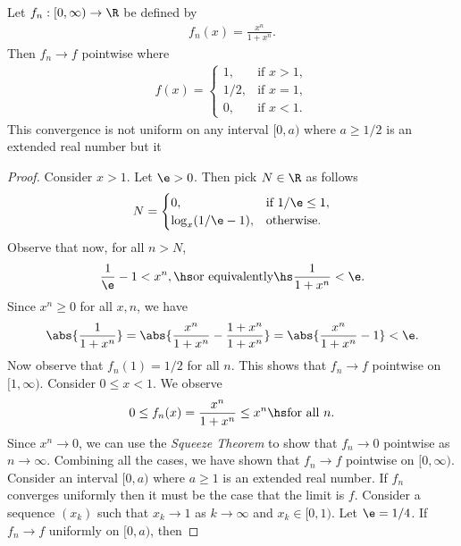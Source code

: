 \documentclass{article}
\begin{document}
\begin{claim*}
	Let $f_n:[0,\infty)\to\R$ be defined by
	\begin{align*}
		f_n(x) = \frac{x^n}{1+x^n}.
	\end{align*}
	Then $f_n\to f$ pointwise where
	\begin{align*}
		f(x) = \begin{cases}
			       1,   & \text{if }x > 1, \\
			       1/2, & \text{if }x = 1, \\
			       0,   & \text{if }x < 1.
		       \end{cases}
	\end{align*}
	This convergence is not uniform on any interval $[0, a)$ where
	$a\geq 1/2$ is an extended real number but it
\end{claim*}
\begin{proof}
	Consider $x>1$. Let $\e>0$. Then pick $N\in\R$ as follows
	\begin{align*}
		N = \begin{cases}
			    0,              & \text{if }1/\e \leq 1, \\
			    \log_x(1/\e-1), & \text{otherwise.}
		    \end{cases}
	\end{align*}
	Observe that now, for all $n>N$,
	\begin{align*}
		\frac{1}{\e} - 1 < x^n,
		\hs\text{or equivalently}\hs
		\frac{1}{1+x^n}< \e.
	\end{align*}
	Since $x^n\geq 0$ for all $x,n$, we have
	\begin{align*}
		\abs{\frac{1}{1+x^n}}=\abs{\frac{x^n}{1+x^n}-\frac{1+x^n}{1+x^n}}
		=\abs{\frac{x^n}{1+x^n}-1}<\e.
	\end{align*}
	Now observe that $f_n(1)=1/2$ for all $n$.
	This shows that $f_n\to f$ pointwise on $[1,\infty)$. Consider $0\leq x<1$.
	We observe
	\begin{align*}
		0 \leq f_n(x)=\frac{x^n}{1 + x^n} \leq x^n\hs\text{for all }n.
	\end{align*}
	Since $x^n\to 0$, we can use the \emph{Squeeze Theorem} to show that
	$f_n\to 0$ pointwise as $n\to\infty$. Combining all the cases, we have shown that
	$f_n\to f$ pointwise on $[0, \infty)$. Consider an interval $[0,a)$ where $a\geq 1$
	is an extended real number. If $f_n$ converges uniformly then it must be the
	case that the limit is $f$. Consider a sequence $(x_k)$ such that $x_k\to 1$ as
	$k\to\infty$ and $x_k\in[0,1)$. Let $\e=1/4$. If $f_n\to f$ uniformly on $[0, a)$, then

\end{proof}
\end{document}
